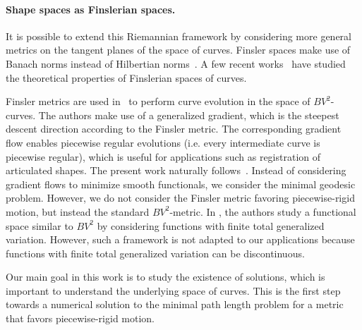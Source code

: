 \paragraph{Shape spaces as Finslerian spaces.}

It is possible to extend this Riemannian framework by considering more general metrics on the tangent planes of the space of curves. Finsler spaces make use of Banach norms instead of Hilbertian norms~\cite{RF-geometry}. A few recent works~\cite{Mennucci-CIME,Yezzi-Menn-2005a,Rigid-evol} have studied the theoretical properties of Finslerian spaces of curves. 

Finsler metrics are used in~\cite{Rigid-evol} to perform curve evolution in the space of $BV^2$-curves. The authors make use of a generalized gradient, which is the steepest descent direction  according to the Finsler metric. The corresponding gradient flow enables piecewise regular evolutions (i.e. every intermediate curve is piecewise regular), which is useful for applications such as registration of articulated shapes.  
%
The present work naturally follows~\cite{Rigid-evol}. Instead of considering gradient flows to minimize smooth functionals, we consider the minimal geodesic problem. 
However, we do not consider the Finsler metric favoring piecewise-rigid motion, but instead the standard $BV^2$-metric.
In \cite{Bredies}, the authors study a functional space similar to $BV^2$ by considering functions with finite  total  generalized variation. However, such a framework is not adapted to our applications because functions with finite total generalized variation can be discontinuous.

Our main goal in this work is to study the existence of solutions, which is important to understand the underlying space of curves. This is the first step towards a numerical solution to the minimal path length problem for a metric that favors piecewise-rigid motion.




